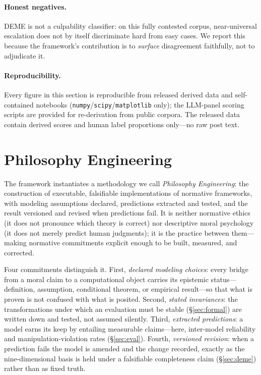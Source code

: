 \paragraph{Honest negatives.} DEME is not a culpability classifier: on this fully contested
corpus, near-universal escalation does not by itself discriminate hard from easy cases. We
report this because the framework's contribution is to \emph{surface} disagreement
faithfully, not to adjudicate it.

\paragraph{Reproducibility.} Every figure in this section is reproducible from released
derived data and self-contained notebooks (\texttt{numpy}/\texttt{scipy}/\texttt{matplotlib}
only); the LLM-panel scoring scripts are provided for re-derivation from public corpora. The
released data contain derived scores and human label proportions only---no raw post text.

\section{Philosophy Engineering}
\label{sec:phileng}
The framework instantiates a methodology we call \emph{Philosophy Engineering}: the
construction of executable, falsifiable implementations of normative frameworks, with modeling
assumptions declared, predictions extracted and tested, and the result versioned and revised
when predictions fail. It is neither normative ethics (it does not pronounce which theory is
correct) nor descriptive moral psychology (it does not merely predict human judgments); it is
the practice between them---making normative commitments explicit enough to be built, measured,
and corrected.

Four commitments distinguish it. First, \emph{declared modeling choices}: every bridge from a
moral claim to a computational object carries its epistemic status---definition, assumption,
conditional theorem, or empirical result---so that what is proven is not confused with what is
posited. Second, \emph{stated invariances}: the transformations under which an evaluation must
be stable (\S\ref{sec:formal}) are written down and tested, not assumed silently. Third,
\emph{extracted predictions}: a model earns its keep by entailing measurable claims---here,
inter-model reliability and manipulation-violation rates (\S\ref{sec:eval}). Fourth,
\emph{versioned revision}: when a prediction fails the model is amended and the change recorded,
exactly as the nine-dimensional basis is held under a falsifiable completeness claim
(\S\ref{sec:deme}) rather than as fixed truth.

